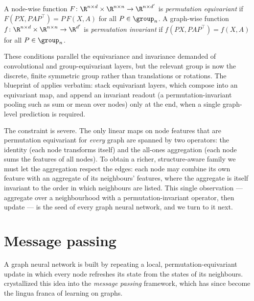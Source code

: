 \begin{definition}
\label{def:graphs:equiv-inv}
A node-wise function $F \colon \R^{n \times d} \times \R^{n \times n} \to
\R^{n \times d'}$ is \emph{permutation equivariant} if
$F(P X, P A P^\top) = P\, F(X, A)$ for all $P \in \group_n$. A graph-wise
function $f \colon \R^{n \times d} \times \R^{n \times n} \to \R^{d'}$ is
\emph{permutation invariant} if $f(P X, P A P^\top) = f(X, A)$ for all
$P \in \group_n$.
\end{definition}

These conditions parallel the equivariance and invariance demanded of
convolutional and group-equivariant layers, but the relevant group is now the
discrete, finite symmetric group rather than translations or rotations. The
blueprint of  applies verbatim: stack equivariant layers, which
compose into an equivariant map, and append an invariant readout (a
permutation-invariant pooling such as sum or mean over nodes) only at the end,
when a single graph-level prediction is required.

The constraint is severe. The only linear maps on node features that are
permutation equivariant for \emph{every} graph are spanned by two operators: the
identity (each node transforms itself) and the all-ones aggregation (each node
sums the features of all nodes). To obtain a richer, structure-aware family we
must let the aggregation respect the edges: each node may combine its own feature
with an aggregate of its neighbours' features, where the aggregate is itself
invariant to the order in which neighbours are listed. This single observation
--- aggregate over a neighbourhood with a permutation-invariant operator, then
update --- is the seed of every graph neural network, and we turn to it next.

\section{Message passing}
\label{sec:graphs:message-passing}

A graph neural network is built by repeating a local, permutation-equivariant
update in which every node refreshes its state from the states of its neighbours.
\citet{gilmer2017neural} crystallized this idea into the \emph{message passing}
framework, which has since become the lingua franca of learning on graphs.

